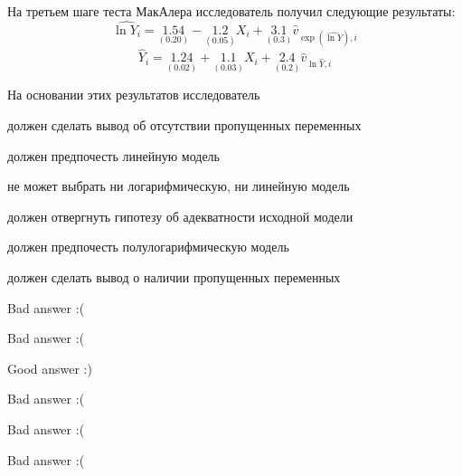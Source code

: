 
\begin{question}
На третьем шаге теста МакАлера исследователь получил следующие результаты:
\[
\widehat{\ln Y_i} = \underset{(0.20)}{1.54} - \underset{(0.05)}{1.2}X_i + \underset{(0.3)}{3.1}\hat v_{\exp(\widehat{\ln Y}),i}
\]
\[
\hat Y_i = \underset{(0.02)}{1.24} + \underset{(0.03)}{1.1}X_i + \underset{(0.2)}{2.4}\hat v_{\ln \hat Y, i}
\]

На основании этих результатов исследователь
\begin{answerlist}
  \item должен сделать вывод об отсутствии пропущенных переменных
  \item должен предпочесть линейную модель
  \item не может выбрать ни логарифмическую, ни линейную модель
  \item должен отвергнуть гипотезу об адекватности исходной модели
  \item должен предпочесть полулогарифмическую модель
  \item должен сделать вывод о наличии пропущенных переменных
\end{answerlist}
\end{question}

\begin{solution}
\begin{answerlist}
  \item Bad answer :(
  \item Bad answer :(
  \item Good answer :)
  \item Bad answer :(
  \item Bad answer :(
  \item Bad answer :(
\end{answerlist}
\end{solution}

